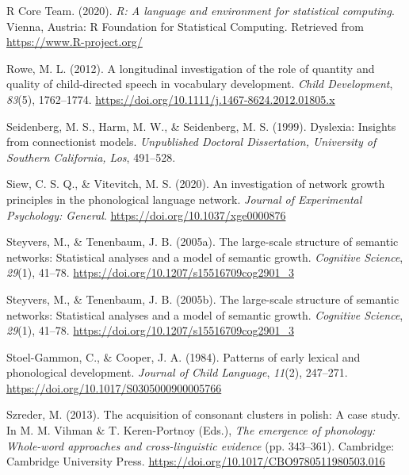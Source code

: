 \documentclass[
  english,
  man,floatsintext]{apa6}
\begin{document}
\leavevmode\hypertarget{ref-R-base}{}%
R Core Team. (2020). \emph{R: A language and environment for statistical computing}. Vienna, Austria: R Foundation for Statistical Computing. Retrieved from \url{https://www.R-project.org/}

\leavevmode\hypertarget{ref-rowe_longitudinal_2012}{}%
Rowe, M. L. (2012). A longitudinal investigation of the role of quantity and quality of child-directed speech in vocabulary development. \emph{Child Development}, \emph{83}(5), 1762--1774. \url{https://doi.org/10.1111/j.1467-8624.2012.01805.x}

\leavevmode\hypertarget{ref-seidenberg_dyslexia_1999}{}%
Seidenberg, M. S., Harm, M. W., \& Seidenberg, M. S. (1999). Dyslexia: Insights from connectionist models. \emph{Unpublished Doctoral Dissertation, University of Southern California, Los}, 491--528.

\leavevmode\hypertarget{ref-siew_investigation_2020}{}%
Siew, C. S. Q., \& Vitevitch, M. S. (2020). An investigation of network growth principles in the phonological language network. \emph{Journal of Experimental Psychology: General}. \url{https://doi.org/10.1037/xge0000876}

\leavevmode\hypertarget{ref-steyvers_large-scale_2005-2}{}%
Steyvers, M., \& Tenenbaum, J. B. (2005a). The large-scale structure of semantic networks: Statistical analyses and a model of semantic growth. \emph{Cognitive Science}, \emph{29}(1), 41--78. \url{https://doi.org/10.1207/s15516709cog2901_3}

\leavevmode\hypertarget{ref-steyvers_large-scale_2005}{}%
Steyvers, M., \& Tenenbaum, J. B. (2005b). The large-scale structure of semantic networks: Statistical analyses and a model of semantic growth. \emph{Cognitive Science}, \emph{29}(1), 41--78. \url{https://doi.org/10.1207/s15516709cog2901_3}

\leavevmode\hypertarget{ref-stoel-gammon_patterns_1984}{}%
Stoel-Gammon, C., \& Cooper, J. A. (1984). Patterns of early lexical and phonological development. \emph{Journal of Child Language}, \emph{11}(2), 247--271. \url{https://doi.org/10.1017/S0305000900005766}

\leavevmode\hypertarget{ref-szreder_acquisition_2013}{}%
Szreder, M. (2013). The acquisition of consonant clusters in polish: A case study. In M. M. Vihman \& T. Keren-Portnoy (Eds.), \emph{The emergence of phonology: Whole-word approaches and cross-linguistic evidence} (pp. 343--361). Cambridge: Cambridge University Press. \url{https://doi.org/10.1017/CBO9780511980503.016}
\end{document}
